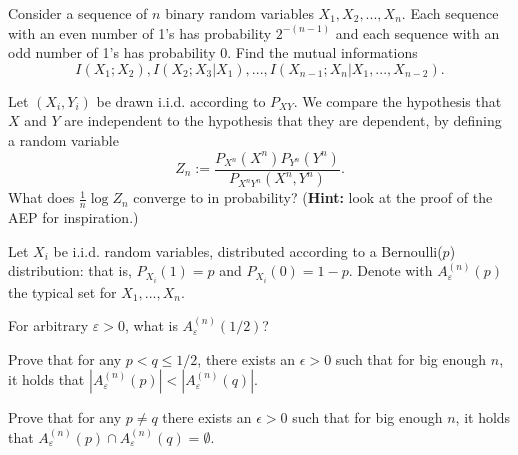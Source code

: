 \documentclass[a4paper,10pt,landscape,twocolumn]{scrartcl}
\begin{document}
\begin{exercise}
Consider a sequence of $n$ binary random variables $X_1, X_2, ..., X_n$.
Each sequence with an even number of 1's has probability $2^{-(n-1)}$ and each sequence with an odd number
of 1's has probability 0. Find the mutual informations
\[
I(X_1;X_2), I(X_2;X_3|X_1), ..., I(X_{n-1};X_n|X_1, ..., X_{n-2}).
\]
\end{exercise}
\vspace{-0.5cm}

\begin{exercise}[Independence?]
	Let $(X_i,Y_i)$ be drawn i.i.d. according to $P_{XY}$. We compare the hypothesis that $X$ and $Y$ are independent to the hypothesis that they are dependent, by defining a random variable
	\[
	Z_n := \frac{P_{X^n}({X^n})P_{Y^n}(Y^n)}{P_{X^nY^n}(X^n,Y^n)}.
	\]
	What does $\frac{1}{n} \log Z_n$ converge to in probability? (\textbf{Hint:} look at the proof of the AEP for inspiration.)
\end{exercise}

\begin{exercise}
	Let $X_i$ be i.i.d. random variables, distributed according to a Bernoulli($p$) distribution: that is, $P_{X_i}(1) = p$ and $P_{X_i}(0) = 1-p$. Denote with $A_{\varepsilon}^{(n)}(p)$ the typical set for $X_1, ..., X_n$.
	
	\begin{subex}
		For arbitrary $\varepsilon > 0$, what is $A_{\varepsilon}^{(n)}(1/2)$?
	\end{subex}
	\begin{subex}
		Prove that for any $p < q \leq 1/2$, there exists
                an $\epsilon > 0$ such that for big enough $n$, it holds that $|A_{\varepsilon}^{(n)}(p)| < |A_{\varepsilon}^{(n)}(q)|$.
	\end{subex}
\begin{subex**}
	Prove that for any $p \neq q$ there exists an $\epsilon > 0$ such that for big enough $n$, it holds that $A_{\varepsilon}^{(n)}(p) \cap A_{\varepsilon}^{(n)}(q) = \emptyset$.
\end{subex**}
\end{exercise}
\end{document}
